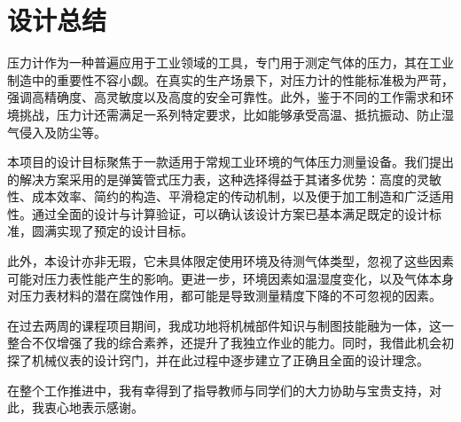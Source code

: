\section{设计总结}
压力计作为一种普遍应用于工业领域的工具，专门用于测定气体的压力，其在工业制造中的重要性不容小觑。在真实的生产场景下，对压力计的性能标准极为严苛，强调高精确度、高灵敏度以及高度的安全可靠性。此外，鉴于不同的工作需求和环境挑战，压力计还需满足一系列特定要求，比如能够承受高温、抵抗振动、防止湿气侵入及防尘等。
\newline

本项目的设计目标聚焦于一款适用于常规工业环境的气体压力测量设备。我们提出的解决方案采用的是弹簧管式压力表，这种选择得益于其诸多优势：高度的灵敏性、成本效率、简约的构造、平滑稳定的传动机制，以及便于加工制造和广泛适用性。通过全面的设计与计算验证，可以确认该设计方案已基本满足既定的设计标准，圆满实现了预定的设计目标。
\newline

此外，本设计亦非无瑕，它未具体限定使用环境及待测气体类型，忽视了这些因素可能对压力表性能产生的影响。更进一步，环境因素如温湿度变化，以及气体本身对压力表材料的潜在腐蚀作用，都可能是导致测量精度下降的不可忽视的因素。
\newline

在过去两周的课程项目期间，我成功地将机械部件知识与制图技能融为一体，这一整合不仅增强了我的综合素养，还提升了我独立作业的能力。同时，我借此机会初探了机械仪表的设计窍门，并在此过程中逐步建立了正确且全面的设计理念。
\newline

在整个工作推进中，我有幸得到了指导教师与同学们的大力协助与宝贵支持，对此，我衷心地表示感谢。